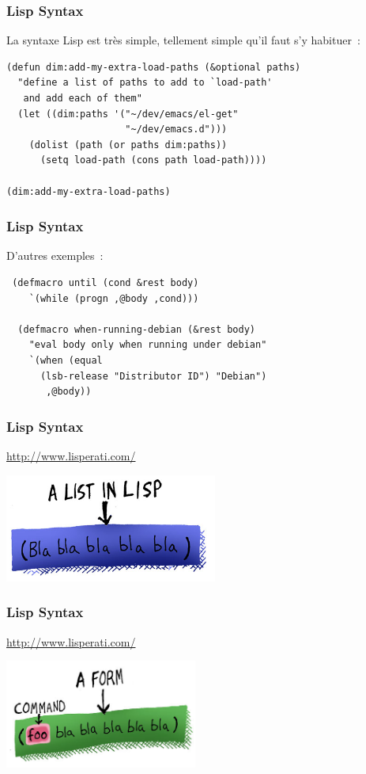 \documentclass{beamer}
\begin{document}
\begin{frame}[fragile]
  \frametitle{Lisp Syntax}

  La syntaxe Lisp est très simple, tellement simple qu'il faut s'y habituer :

\begin{example}
\begin{verbatim}
(defun dim:add-my-extra-load-paths (&optional paths)
  "define a list of paths to add to `load-path'
   and add each of them"
  (let ((dim:paths '("~/dev/emacs/el-get"
                     "~/dev/emacs.d")))
    (dolist (path (or paths dim:paths))
      (setq load-path (cons path load-path))))

(dim:add-my-extra-load-paths)
\end{verbatim}
\end{example}
\end{frame}
\begin{frame}[fragile]
  \frametitle{Lisp Syntax}

  D'autres exemples :

\begin{example}
\begin{verbatim}
 (defmacro until (cond &rest body)
    `(while (progn ,@body ,cond)))

  (defmacro when-running-debian (&rest body)
    "eval body only when running under debian"
    `(when (equal
  	  (lsb-release "Distributor ID") "Debian")
       ,@body))
\end{verbatim}
\end{example}

\end{frame}

\begin{frame}[fragile]
  \frametitle{Lisp Syntax}
  \begin{center}
    \url{http://www.lisperati.com/}

    \includegraphics[height=1.4in]{lisp-list.jpg}
  \end{center}
\end{frame}

\begin{frame}[fragile]
  \frametitle{Lisp Syntax}
  \begin{center}
    \url{http://www.lisperati.com/}

    \includegraphics[height=1.4in]{lisp-form.jpg}
  \end{center}
\end{frame}
\end{document}
